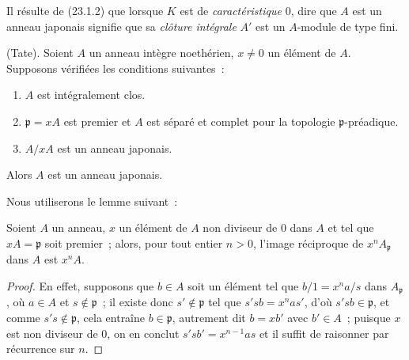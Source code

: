 Il résulte de (23.1.2) que lorsque $K$ est de \emph{caractéristique} $0$, dire que
$A$ est un anneau japonais signifie que sa \emph{clôture intégrale} $A'$ est
un $A$-module de type fini.

\begin{theorem}[23.1.3]
\label{0.23.1.3-fr}
\textnormal{(Tate).} Soient $A$ un anneau intègre noethérien, $x\neq0$ un
élément de $A$. Supposons vérifiées les conditions suivantes~:
\begin{enumerate}
  \item[\textup{(i)}] $A$ est intégralement clos.
  \item[\textup{(ii)}] $\mathfrak p=xA$ est premier et $A$ est séparé et complet pour
  la topologie $\mathfrak p$-préadique.
  \item[\textup{(iii)}] $A/xA$ est un anneau japonais.
\end{enumerate}

Alors $A$ est un anneau japonais.
\end{theorem}

Nous utiliserons le lemme suivant~:

\begin{lemma}[23.1.3.1]
\label{0.23.1.3.1-fr}
Soient $A$ un anneau, $x$ un élément de $A$ non diviseur de $0$ dans $A$ et
tel que $xA=\mathfrak p$ soit premier~; alors, pour tout entier $n>0$,
l'image réciproque de $x^nA_{\mathfrak p}$ dans $A$ est $x^nA$.
\end{lemma}

\begin{proof}
En effet, supposons que $b\in A$ soit un élément tel que
$b/1=x^na/s$ dans $A_{\mathfrak p}$, où $a\in A$ et
$s\notin\mathfrak p$~; il existe donc $s'\notin\mathfrak p$ tel que
$s'sb=x^nas'$, d'où $s'sb\in\mathfrak p$, et comme
$s's\notin\mathfrak p$, cela entraîne $b\in\mathfrak p$, autrement dit
$b=xb'$ avec $b'\in A$~; puisque $x$ est non diviseur de $0$, on en conclut
$s'sb'=x^{n-1}as$ et il suffit de raisonner par récurrence sur $n$.
\end{proof}

